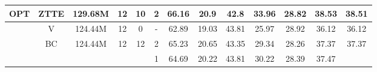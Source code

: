 \begin{table*}[ht]
\begin{tabular}{cc|c|c|c|c|ccccc|c|c}
\multicolumn{1}{c|}{\multirow{-7}{*}{OPT}}                                                    & \multirow{-2}{*}{\cellcolor[HTML]{C0C0C0}ZTTE} & \multirow{-2}{*}{\cellcolor[HTML]{C0C0C0}129.68M} & \multirow{-2}{*}{\cellcolor[HTML]{C0C0C0}12}                   & \multirow{-2}{*}{\cellcolor[HTML]{C0C0C0}10}                      & \cellcolor[HTML]{C0C0C0}2                                      & \cellcolor[HTML]{C0C0C0}66.16 & \cellcolor[HTML]{C0C0C0}20.9  & \cellcolor[HTML]{C0C0C0}42.8  & \cellcolor[HTML]{C0C0C0}33.96 & \cellcolor[HTML]{C0C0C0}28.82 & \cellcolor[HTML]{C0C0C0}38.53 & \multirow{-2}{*}{\cellcolor[HTML]{C0C0C0}\textbf{38.51}} \\ \hline
\multicolumn{1}{c|}{}                                                                         & V                                             & 124.44M                                           & 12                                                             & 0                                                                 & -                                                              & 62.89                         & 19.03                         & 43.81                         & 25.97                         & 28.92                         & 36.12                         & 36.12                                                    \\ \cline{2-13} 
\multicolumn{1}{c|}{}                                                                         & BC                                            & 124.44M                                           & 12                                                             & 12                                                                & 2                                                              & 65.23                         & 20.65                         & 43.35                         & 29.34                         & 28.26                         & 37.37                         & 37.37                                                    \\ \cline{2-13} 
\multicolumn{1}{c|}{}                                                                         &                                               &                                                   &                                                                &                                                                   & 1                                                              & 64.69                         & 20.22                         & 43.81                         & 30.22                         & 28.39                         & 37.47                         &                                                          \\

\end{tabular}
\end{table*}
